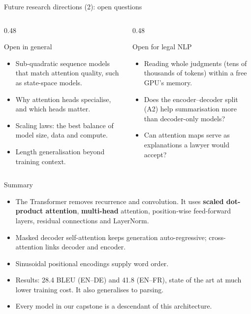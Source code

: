 \documentclass[aspectratio=169,11pt]{beamer}
\begin{document}
\begin{frame}{Future research directions (2): open questions}
  \begin{columns}[T]
    \begin{column}{0.48\textwidth}
      \begin{block}{Open in general}
        \small
        \begin{itemize}
          \item Sub-quadratic sequence models that match attention quality, such as state-space models.
          \item Why attention heads specialise, and which heads matter.
          \item Scaling laws: the best balance of model size, data and compute.
          \item Length generalisation beyond training context.
        \end{itemize}
      \end{block}
    \end{column}
    \begin{column}{0.48\textwidth}
      \begin{exampleblock}{Open for legal NLP}
        \small
        \begin{itemize}
          \item Reading whole judgments (tens of thousands of tokens) within a free GPU's memory.
          \item Does the encoder--decoder split (A2) help summarisation more than decoder-only models?
          \item Can attention maps serve as explanations a lawyer would accept?
        \end{itemize}
      \end{exampleblock}
    \end{column}
  \end{columns}
\end{frame}

\begin{frame}{Summary}
  \begin{itemize}
    \item The Transformer removes recurrence and convolution. It uses \textbf{scaled dot-product attention}, \textbf{multi-head} attention, position-wise feed-forward layers, residual connections and LayerNorm.
    \item Masked decoder self-attention keeps generation auto-regressive; cross-attention links decoder and encoder.
    \item Sinusoidal positional encodings supply word order.
    \item Results: 28.4 BLEU (EN--DE) and 41.8 (EN--FR), state of the art at much lower training cost. It also generalises to parsing.
    \item Every model in our capstone is a descendant of this architecture.
  \end{itemize}
\end{frame}
\end{document}
